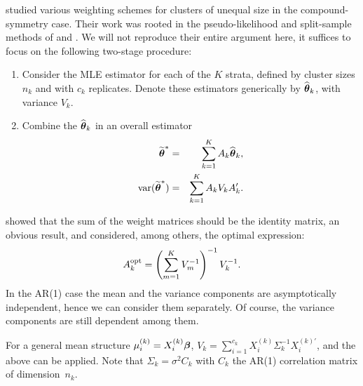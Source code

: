 \documentclass[11pt,a5paper,twoside]{book}
\newcommand{\bftheta}{\mbox{\boldmath $\theta$}}
\newcommand{\bfbeta}{\mbox{\boldmath $\beta$}}
\begin{document}
\cite{hermans2017_cs} studied various weighting schemes for clusters of unequal size in the compound-symmetry case. Their work was rooted in the pseudo-likelihood and split-sample methods of \cite{Verbeke2006} and \cite{Iddi2011}. We will not reproduce their entire argument here, it suffices to focus on the following two-stage procedure:
\begin{enumerate}
  \item Consider the MLE estimator for each of the $K$ strata, defined by cluster sizes $n_k$ and with $c_k$ replicates. Denote these estimators generically by $\widehat{\bftheta}_k$, with variance $V_k$. 
  \item Combine the $\widehat{\bftheta}_k$ in an overall estimator
\begin{eqnarray}
\label{schattergenericappendix}
\widetilde{\bftheta}^*&=&\sum_{k=1}^KA_k\widehat{\bftheta}_k,\\
\label{asymptoticgenericappendix}
\mbox{var}(\widetilde{\bftheta}^*)&=&\sum_{k=1}^KA_kV_kA_k'.
\end{eqnarray}
\end{enumerate}
\cite{hermans2017_cs} showed that the sum of the weight matrices should be the identity matrix, an obvious result, and considered, among others, the optimal expression:
\begin{equation}
\label{optimalwt_appendix}
A_k^{\mbox{\scriptsize opt}}=\left(\sum_{m=1}^KV_m^{-1}\right)^{-1}V_k^{-1}.
\end{equation}
In the AR(1) case the mean and the variance components are asymptotically independent, hence we can consider them separately. Of course, the variance components are still dependent among them.

For a general mean structure $\mathbf{\mu}_i^{(k)}=X_i^{(k)}\bfbeta$, $V_k=\sum_{i=1}^{c_k}X_i^{(k)}\Sigma_k^{-1}X_i^{(k)'}$, and the above can be applied. Note that $\Sigma_k=\sigma^2C_k$ with $C_k$ the AR(1) correlation matrix of dimension~$n_k$.
\end{document}
